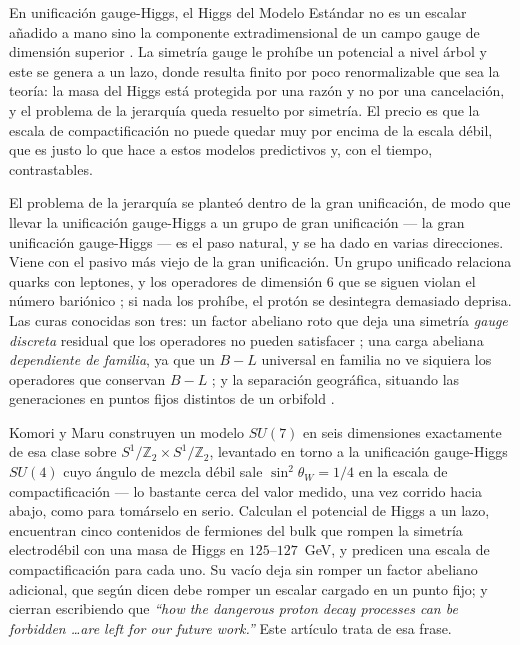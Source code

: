 \documentclass[11pt,a4paper]{article}
\newcommand{\ZZ}{\mathbb{Z}}
\newcommand{\su}[1]{SU(#1)}
\begin{document}
En unificación gauge-Higgs, el Higgs del Modelo Estándar no es un escalar añadido a mano sino la
componente extradimensional de un campo gauge de dimensión superior \cite{Manton,Hosotani}. La
simetría gauge le prohíbe un potencial a nivel árbol y este se genera a un lazo, donde resulta finito
por poco renormalizable que sea la teoría: la masa del Higgs está protegida por una razón y no por
una cancelación, y el problema de la jerarquía queda resuelto por simetría. El precio es que la
escala de compactificación no puede quedar muy por encima de la escala débil, que es justo lo que
hace a estos modelos predictivos y, con el tiempo, contrastables.

El problema de la jerarquía se planteó dentro de la gran unificación, de modo que llevar la
unificación gauge-Higgs a un grupo de gran unificación --- la gran unificación gauge-Higgs --- es el
paso natural, y se ha dado en varias direcciones. Viene con el pasivo más viejo de la gran
unificación. Un grupo unificado relaciona quarks con leptones, y los operadores de dimensión 6 que se
siguen violan el número bariónico \cite{Weinberg,WZ}; si nada los prohíbe, el protón se desintegra
demasiado deprisa. Las curas conocidas son tres: un factor abeliano roto que deja una simetría
\emph{gauge discreta} residual que los operadores no pueden satisfacer \cite{KW,IR}; una carga
abeliana \emph{dependiente de familia}, ya que un $B-L$ universal en familia no ve siquiera los
operadores que conservan $B-L$ \cite{FamilyU1}; y la separación geográfica, situando las generaciones
en puntos fijos distintos de un orbifold \cite{Raby,OrbGUT}.

Komori y Maru \cite{KM25} construyen un modelo $\su7$ en seis dimensiones exactamente de esa clase
sobre $S^1/\ZZ_2\times S^1/\ZZ_2$, levantado en torno a la unificación gauge-Higgs $\su4$ cuyo ángulo
de mezcla débil sale $\sin^2\theta_W=1/4$ en la escala de compactificación \cite{AHMN} --- lo bastante
cerca del valor medido, una vez corrido hacia abajo, como para tomárselo en serio. Calculan el
potencial de Higgs a un lazo, encuentran cinco contenidos de fermiones del bulk que rompen la simetría
electrodébil con una masa de Higgs en $125$--$127$~GeV, y predicen una escala de compactificación para
cada uno. Su vacío deja sin romper un factor abeliano adicional, que según dicen debe romper un
escalar cargado en un punto fijo; y cierran escribiendo que \emph{``how the dangerous proton decay
processes can be forbidden \dots are left for our future work.''} Este artículo trata de esa frase.
\end{document}
